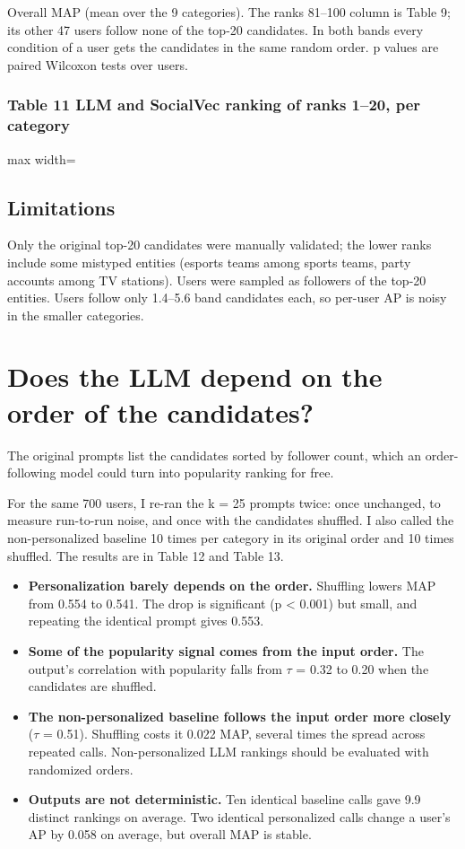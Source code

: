 \documentclass[10pt]{article}
\begin{document}
{\small Overall MAP (mean over the 9 categories). The ranks 81--100 column is Table 9; its other 47 users follow none of the top-20 candidates. In both bands every condition of a user gets the candidates in the same random order. p values are paired Wilcoxon tests over users.}

\subsubsection*{Table 11 \textperiodcentered{} LLM and SocialVec ranking of ranks 1--20, per category}
\begin{center}\begin{adjustbox}{max width=\linewidth}

\end{adjustbox}\end{center}

\subsection*{Limitations}
Only the original top-20 candidates were manually validated; the lower ranks include some mistyped entities (esports teams among sports teams, party accounts among TV stations). Users were sampled as followers of the top-20 entities. Users follow only 1.4--5.6 band candidates each, so per-user AP is noisy in the smaller categories.

\section{Does the LLM depend on the order of the candidates?}
The original prompts list the candidates sorted by follower count, which an order-following model could turn into popularity ranking for free.

For the same 700 users, I re-ran the k = 25 prompts twice: once unchanged, to measure run-to-run noise, and once with the candidates shuffled. I also called the non-personalized baseline 10 times per category in its original order and 10 times shuffled. The results are in Table 12 and Table 13.

\begin{itemize}
  \item \textbf{Personalization barely depends on the order.} Shuffling lowers MAP from 0.554 to 0.541. The drop is significant (p \textless{} 0.001) but small, and repeating the identical prompt gives 0.553.
  \item \textbf{Some of the popularity signal comes from the input order.} The output's correlation with popularity falls from $\tau$ = 0.32 to 0.20 when the candidates are shuffled.
  \item \textbf{The non-personalized baseline follows the input order more closely} ($\tau$ = 0.51). Shuffling costs it 0.022 MAP, several times the spread across repeated calls. Non-personalized LLM rankings should be evaluated with randomized orders.
  \item \textbf{Outputs are not deterministic.} Ten identical baseline calls gave 9.9 distinct rankings on average. Two identical personalized calls change a user's AP by 0.058 on average, but overall MAP is stable.
\end{itemize}
\end{document}
